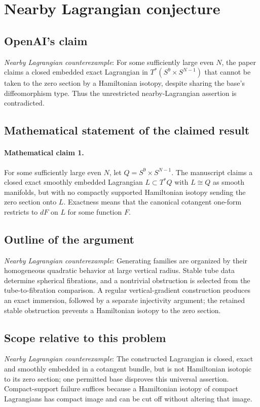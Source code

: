 \documentclass[11pt]{article}
\begin{document}
\section*{Nearby Lagrangian conjecture}

\subsection{OpenAI's claim}
\textit{Nearby Lagrangian counterexample}: For some sufficiently large even $N$, the paper claims a closed embedded exact Lagrangian in $T^*(S^9\times S^{N-1})$ that cannot be taken to the zero section by a Hamiltonian isotopy, despite sharing the base’s diffeomorphism type. Thus the unrestricted nearby-Lagrangian assertion is contradicted.

\subsection{Mathematical statement of the claimed result}
\paragraph{Mathematical claim 1.} For some sufficiently large even $N$, let $Q=S^9\times S^{N-1}$. The manuscript claims a closed exact smoothly embedded Lagrangian $L\subset T^*Q$ with $L\cong Q$ as smooth manifolds, but with no compactly supported Hamiltonian isotopy sending the zero section onto $L$. Exactness means that the canonical cotangent one-form restricts to $dF$ on $L$ for some function $F$.

\subsection{Outline of the argument}
\textit{Nearby Lagrangian counterexample}: Generating families are organized by their homogeneous quadratic behavior at large vertical radius. Stable tube data determine spherical fibrations, and a nontrivial obstruction is selected from the tube-to-fibration comparison. A regular vertical-gradient construction produces an exact immersion, followed by a separate injectivity argument; the retained stable obstruction prevents a Hamiltonian isotopy to the zero section.

\subsection{Scope relative to this problem}
\textit{Nearby Lagrangian counterexample}: The constructed Lagrangian is closed, exact and smoothly embedded in a cotangent bundle, but is not Hamiltonian isotopic to its zero section; one permitted base disproves this universal assertion. Compact-support failure suffices because a Hamiltonian isotopy of compact Lagrangians has compact image and can be cut off without altering that image.
\end{document}
